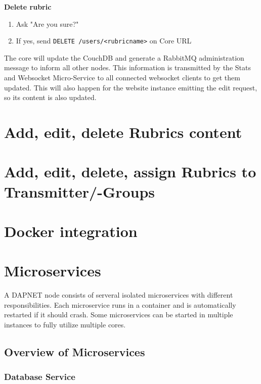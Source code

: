 \textbf{Delete rubric}
\begin{enumerate}
\item Ask "Are you sure?"
\item If yes, send \texttt{DELETE /users/<rubricname>} on Core URL
\end{enumerate}

The core will update the CouchDB and generate a RabbitMQ administration message
to inform all other nodes. This information is transmitted by the Stats and
Websocket Micro-Service to all connected websocket clients to get them updated.
This will also happen for the website instance emitting the edit request, so its
content is also updated.

\section{Add, edit, delete Rubrics content}

\section{Add, edit, delete, assign Rubrics to Transmitter/-Groups}

\section{Docker integration}
\label{internalprog:docker}

\section{Microservices}
\label{internalprog:microservices}
A DAPNET node consists of serveral isolated microservices with different
responsibilities. Each microservice runs in a container and is automatically
restarted if it should crash. Some microservices can be started in multiple
instances to fully utilize multiple cores.

\subsection{Overview of Microservices}
\label{internalprog:microservices:overview}

\subsubsection{Database Service}
\label{internalprog:microservices:overview:database}


